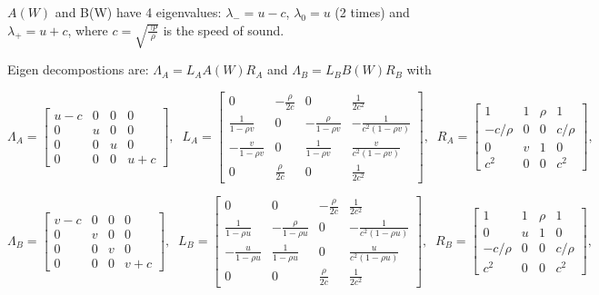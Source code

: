 \documentclass{article}
\begin{document}
$A(W)$ and B(W) have 4 eigenvalues: $\lambda_{-}=u-c$, $\lambda_{0}=u$ (2 times) and $\lambda_{+}=u+c$, where $c=\sqrt{\frac{\gamma p}{\rho}}$ is the speed of sound. 

Eigen decompostions are: $\Lambda_A = L_A A(W) R_A$ and $\Lambda_B = L_B B(W) R_B$ with

\begin{equation}
  \Lambda_A = \left[
    \begin{array}{cccc}
      u-c& 0 & 0 & 0\\
      0  & u & 0 & 0\\
      0  & 0 & u & 0\\
      0  & 0 & 0 & u+c
    \end{array}
  \right],\;\;
  L_A = \left[
    \begin{array}{cccc}
      0                  & -\frac{\rho}{2c} & 0                & \frac{1}{2c^2}\\
      \frac{1}{1-\rho v} & 0                & -\frac{\rho}{1-\rho v} & -\frac{1}{c^2 (1-\rho v)}\\
     -\frac{v}{1-\rho v} & 0                & \frac{1}{1-\rho v}     &  \frac{v}{c^2 (1-\rho v)}\\
      0 & \frac{\rho}{2c}  & 0                & \frac{1}{2c^2}
    \end{array}
  \right],\;\;
  R_A = \left[
    \begin{array}{cccc}
      1       & 1 & \rho & 1\\
      -c/\rho & 0 & 0    & c/\rho\\
      0       & v & 1    & 0\\
      c^2     & 0 & 0    & c^2
    \end{array}
  \right],\;\;
\end{equation}

\begin{equation}
  \Lambda_B = \left[
    \begin{array}{cccc}
      v-c& 0 & 0 & 0\\
      0  & v & 0 & 0\\
      0  & 0 & v & 0\\
      0  & 0 & 0 & v+c
    \end{array}
  \right],\;\;
  L_B = \left[
    \begin{array}{cccc}
      0                  & 0 &-\frac{\rho}{2c} & \frac{1}{2c^2}\\
      \frac{1}{1-\rho u} & -\frac{\rho}{1-\rho u} & 0 & -\frac{1}{c^2 (1-\rho u)}\\
     -\frac{u}{1-\rho u} &  \frac{1}{1-\rho u} & 0     &  \frac{u}{c^2 (1-\rho u)}\\
      0 & 0 & \frac{\rho}{2c} & \frac{1}{2c^2}
    \end{array}
  \right],\;\;
  R_B = \left[
    \begin{array}{cccc}
      1       & 1 & \rho & 1\\
      0       & u & 1    & 0\\
      -c/\rho & 0 & 0    & c/\rho\\
      c^2     & 0 & 0    & c^2
    \end{array}
  \right],\;\;
\end{equation}
\end{document}
